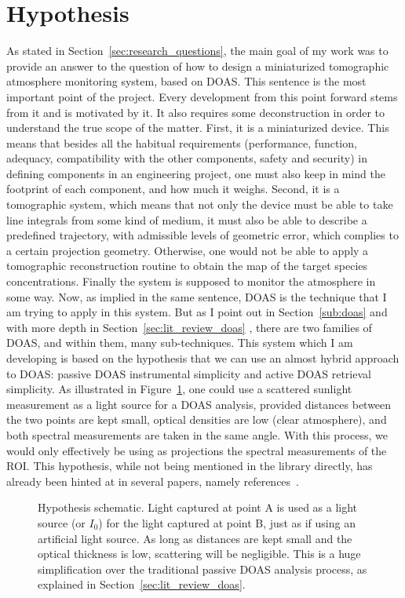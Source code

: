 

\section{Hypothesis}%
\label{sec:intro_hypothesis}

As stated in Section~\ref{sec:research_questions}, the main goal of my
work was to provide an answer to the question of how to design a
miniaturized tomographic atmosphere monitoring system, based on
\gls{DOAS}.  This sentence is the most important point of the project.
Every development from this point forward stems from it and is motivated
by it. It also requires some deconstruction in order to understand the
true scope of the matter. First, it is a miniaturized device. This means
that besides all the habitual requirements (performance, function,
adequacy, compatibility with the other components, safety and security)
in defining components in an engineering project, one must also keep in
mind the footprint of each component, and how much it weighs. Second, it
is a tomographic system, which means that not only the device must be
able to take line integrals from some kind of medium, it must also be
able to describe a predefined trajectory, with admissible levels of
geometric error, which complies to a certain projection geometry.
Otherwise, one would not be able to apply a tomographic reconstruction
routine to obtain the map of the target species concentrations. Finally
the system is supposed to monitor the atmosphere in some way. Now, as
implied in the same sentence, \gls{DOAS} is the technique that I am
trying to apply in this system. But as I point out in
Section~\ref{sub:doas} and with more depth in
Section~\ref{sec:lit_review_doas} , there are two families of
\gls{DOAS}, and within them, many sub-techniques. This system which I am
developing is based on the hypothesis that we can use an almost hybrid
approach to \gls{DOAS}: passive \gls{DOAS} instrumental simplicity and
active \gls{DOAS} retrieval simplicity. As illustrated in
Figure~\ref{fig:hypothesis}, one could use a scattered sunlight
measurement as a light source for a \gls{DOAS} analysis, provided
distances between the two points are kept small, optical densities are
low (clear atmosphere), and both spectral measurements are taken in the
same angle. With this process, we would only effectively be using as
projections the spectral measurements of the \gls{ROI}. This hypothesis,
while not being mentioned in the library directly, has already been
hinted at in several papers, namely references~\cite{Frins2006,
Casaballe2017, Johansson2009}.

\begin{figure}[htpb]
    \centering
    \missingfigure{}
    \caption{Hypothesis schematic. Light captured at point A is used as
        a light source (or $I_0$) for the light captured at point B,
        just as if using an artificial light source. As long as
        distances are kept small and the optical thickness is low,
        scattering will be negligible.  This is a huge simplification
        over the traditional passive \gls{DOAS} analysis process, as
        explained in Section~\ref{sec:lit_review_doas}.}
    \label{fig:hypothesis}
\end{figure}
